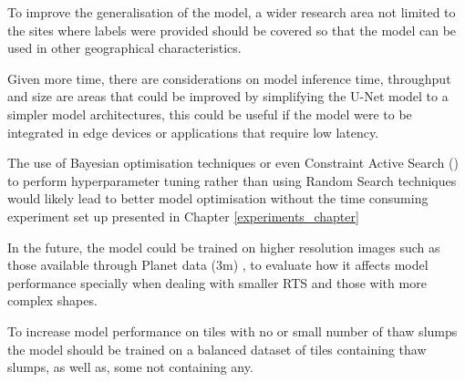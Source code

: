 To improve the generalisation of the model, a wider research area not limited to the sites where labels were provided should be covered so that the model can be used in other geographical characteristics.

Given more time, there are considerations on  model inference time, throughput and size are areas that could be improved by simplifying the U-Net model to a simpler model architectures, this could be useful if the model were to be integrated in edge devices or applications that require low latency.

The use of Bayesian optimisation techniques or even Constraint Active Search (\cite{pmlr-v139-malkomes21a}) to perform hyperparameter tuning rather than using Random Search techniques would likely lead to better model optimisation without the time consuming experiment set up presented in Chapter \ref{experiments_chapter}

In the future, the model could be trained on higher resolution images such as those available through Planet data (3m) , to evaluate how it affects model performance specially when dealing with smaller RTS and those with more complex shapes.

To increase model performance on tiles with no or small number of thaw slumps the model should be trained on a balanced dataset of tiles containing thaw slumps, as well as, some not containing any.